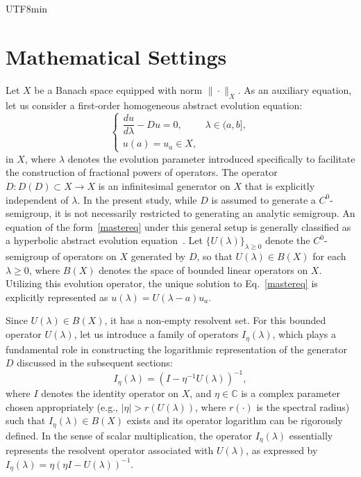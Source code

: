 \documentclass[10pt,a4paper]{article}
\theoremstyle{definition}
\theoremstyle{remark}
\begin{document}
\begin{CJK}{UTF8}{min}
\section{Mathematical Settings}
Let $X$ be a Banach space equipped with norm $\|\cdot\|_X$. 
As an auxiliary equation, let us consider a first-order homogeneous abstract evolution equation:
\begin{equation} \label{mastereq}
\begin{cases}
\dfrac{du}{d\lambda} - D u = 0, & \lambda \in (a,b], \\[2.5mm]
u(a) = u_a \in X,
\end{cases}
\end{equation}
in $X$, where $\lambda$ denotes the evolution parameter introduced specifically to facilitate the construction of fractional powers of operators.
The operator $D : D(D) \subset X \to X$ is an infinitesimal generator on $X$ that is explicitly independent of $\lambda$.
In the present study, while $D$ is assumed to generate a $C^0$-semigroup, it is not necessarily restricted to generating an analytic semigroup. 
An equation of the form~\eqref{mastereq} under this general setup is generally classified as a hyperbolic abstract evolution equation~\cite{70kato, 73kato}.
Let $\{ U(\lambda) \}_{\lambda \ge 0}$ denote the $C^0$-semigroup of operators on $X$ generated by $D$, so that $U(\lambda) \in B(X)$ for each $\lambda \ge 0$, where $B(X)$ denotes the space of bounded linear operators on $X$. 
Utilizing this evolution operator, the unique solution to Eq.~\eqref{mastereq} is explicitly represented as $u(\lambda) = U(\lambda - a) u_a$.

Since $U(\lambda) \in B(X)$, it has a non-empty resolvent set. 
For this bounded operator $U(\lambda)$, let us introduce a family of operators $I_{\eta}(\lambda)$, which plays a fundamental role in constructing the logarithmic representation of the generator $D$ discussed in the subsequent sections:
\begin{equation}
I_{\eta}(\lambda) = (I - \eta^{-1}U(\lambda))^{-1},
\end{equation}
where $I$ denotes the identity operator on $X$, and $\eta \in \mathbb{C}$ is a complex parameter chosen appropriately (e.g., $|\eta| > r(U(\lambda))$, where $r(\cdot)$ is the spectral radius) such that  $I_{\eta}(\lambda) \in B(X)$ exists and its operator logarithm can be rigorously defined. 
In the sense of scalar multiplication, the operator $I_{\eta}(\lambda)$ essentially represents the resolvent operator associated with $U(\lambda)$, as expressed by $I_{\eta}(\lambda) = \eta (\eta I - U(\lambda))^{-1}$.




\end{CJK}
\end{document}
